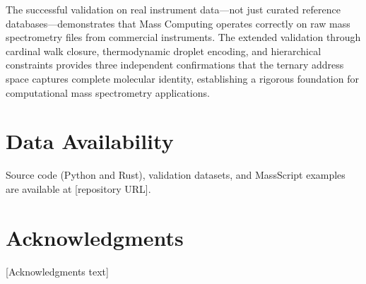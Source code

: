\documentclass[twocolumn,10pt]{article}
\begin{document}
The successful validation on real instrument data---not just curated reference databases---demonstrates that Mass Computing operates correctly on raw mass spectrometry files from commercial instruments. The extended validation through cardinal walk closure, thermodynamic droplet encoding, and hierarchical constraints provides three independent confirmations that the ternary address space captures complete molecular identity, establishing a rigorous foundation for computational mass spectrometry applications.

\section*{Data Availability}

Source code (Python and Rust), validation datasets, and MassScript examples are available at [repository URL].

\section*{Acknowledgments}

[Acknowledgments text]



\end{document}
